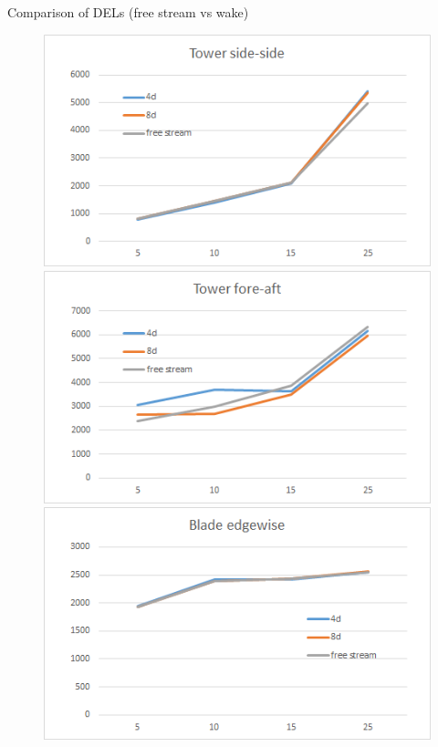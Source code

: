 \documentclass[12pt,t]{beamer}
\begin{document}
\begin{frame}
\Large
Comparison of DELs (free stream vs wake)
\begin{figure}[H]
  \centering
\begin{minipage}{0.40\textwidth}
  \includegraphics[width=1\linewidth]{figures/delsTwrSide.png}
\end{minipage}
\begin{minipage}{0.40\textwidth}
  \includegraphics[width=1\linewidth]{figures/delsTwrFore.png}
\end{minipage}
\begin{minipage}{0.40\textwidth}
  \includegraphics[width=1\linewidth]{figures/delsBldEdge.png}

\end{minipage}
\end{figure}
\end{frame}
\end{document}
